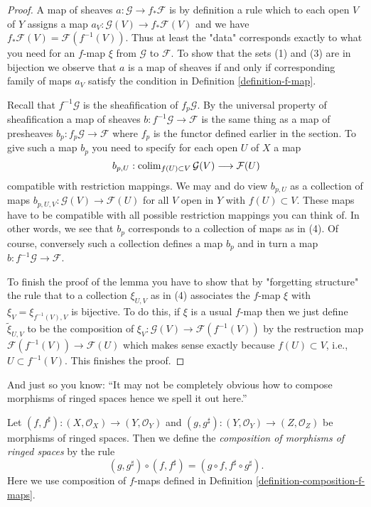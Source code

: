 \begin{proof}
A map of sheaves $a : \mathcal{G} \to f_*\mathcal{F}$
is by definition a rule which to each open $V$ of $Y$ assigns
a map $a_V : \mathcal{G}(V) \to f_*\mathcal{F}(V)$
and we have $f_*\mathcal{F}(V) = \mathcal{F}(f^{-1}(V))$.
Thus at least the "data" corresponds exactly to what you need
for an $f$-map $\xi$ from $\mathcal{G}$ to $\mathcal{F}$.
To show that the sets (1) and (3) are in bijection we observe that
$a$ is a map of sheaves if and only if corresponding family of maps $a_V$
satisfy the condition in Definition \ref{definition-f-map}.

\medskip\noindent
Recall that $f^{-1}\mathcal{G}$ is the sheafification of $f_p\mathcal{G}$.
By the universal property of sheafification a map of sheaves
$b : f^{-1}\mathcal{G} \to \mathcal{F}$ is the same thing as a map of
presheaves $b_p : f_p\mathcal{G} \to \mathcal{F}$ where $f_p$ is the
functor defined earlier in the section. To give such a map $b_p$
you need to specify for each open $U$ of $X$ a map
$$
b_{p, U} :
\mathop{\mathrm{colim}}\nolimits_{f(U) \subset V} \mathcal{G}(V)
\longrightarrow
\mathcal{F}(U)
$$
compatible with restriction mappings. We may and do view $b_{p, U}$
as a collection of maps $b_{p, U, V} : \mathcal{G}(V) \to \mathcal{F}(U)$
for all $V$ open in $Y$ with $f(U) \subset V$. These maps have to be
compatible with all possible restriction mappings you can think of.
In other words, we see that $b_p$ corresponds to a collection of maps
as in (4). Of course, conversely such a collection defines a map
$b_p$ and in turn a map $b : f^{-1}\mathcal{G} \to \mathcal{F}$.

\medskip\noindent
To finish the proof of the lemma you have to show that by
"forgetting structure" the rule that to a collection $\xi_{U, V}$
as in (4) associates the $f$-map $\xi$ with $\xi_V = \xi_{f^{-1}(V), V}$
is bijective. To do this, if $\xi$ is a usual $f$-map then we just
define $\tilde \xi_{U, V}$ to be the composition of
$\xi_V : \mathcal{G}(V) \to \mathcal{F}(f^{-1}(V))$
by the restruction map $\mathcal{F}(f^{-1}(V)) \to \mathcal{F}(U)$
which makes sense exactly because $f(U) \subset V$, i.e.,
$U \subset f^{-1}(V)$. This finishes the proof.
\end{proof}

And just so you know: ``It may not be completely obvious how to compose
morphisms of ringed spaces hence we spell it out here.''

\begin{definition}
\label{definition-composition-maps-ringed-spaces}
Let
$(f, f^\sharp) : (X, \mathcal{O}_X) \to (Y, \mathcal{O}_Y)$ and
$(g, g^\sharp) : (Y, \mathcal{O}_Y) \to (Z, \mathcal{O}_Z)$
be morphisms of ringed spaces. Then we define
the {\it composition of morphisms of ringed spaces}
by the rule
$$
(g, g^\sharp) \circ (f, f^\sharp) = (g \circ f, f^\sharp \circ g^\sharp).
$$
Here we use composition of $f$-maps defined in
Definition \ref{definition-composition-f-maps}.
\end{definition}

